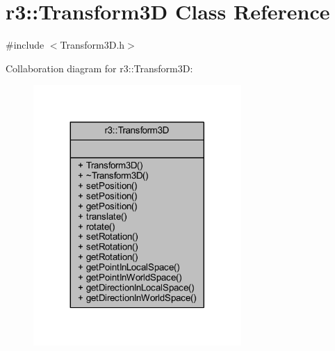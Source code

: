 \hypertarget{classr3_1_1_transform3_d}{}\section{r3\+:\+:Transform3D Class Reference}
\label{classr3_1_1_transform3_d}


{\ttfamily \#include $<$Transform3\+D.\+h$>$}



Collaboration diagram for r3\+:\+:Transform3D\+:\nopagebreak
\begin{figure}[H]
\begin{center}
\leavevmode
\includegraphics[width=224pt]{classr3_1_1_transform3_d__coll__graph}
\end{center}
\end{figure}
